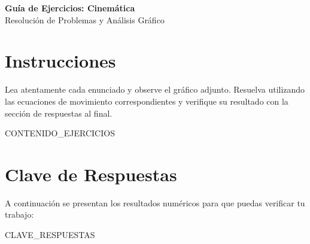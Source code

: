 \documentclass[11pt,a4paper]{article}
\begin{document}
\begin{center}
    \LARGE \textbf{Guía de Ejercicios: Cinemática} \\
    \vspace{0.2cm}
    \large Resolución de Problemas y Análisis Gráfico
\end{center}

\vspace{0.5cm}

\section*{Instrucciones}
Lea atentamente cada enunciado y observe el gráfico adjunto. Resuelva utilizando las ecuaciones de movimiento correspondientes y verifique su resultado con la sección de respuestas al final.

\vspace{0.5cm}

{{ CONTENIDO_EJERCICIOS }}

\newpage

\section*{Clave de Respuestas}
A continuación se presentan los resultados numéricos para que puedas verificar tu trabajo:

\begin{enumerate}[label=\textbf{Ejercio \arabic*:}]
{{ CLAVE_RESPUESTAS }}
\end{enumerate}
\end{document}
